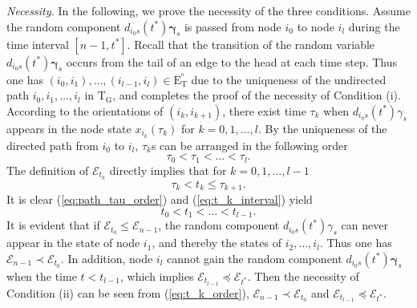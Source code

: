 \documentclass[a4paper, 11pt]{article}
\newcommand{\1}{\mathbf{1}}
\newcommand{\asf}{\mathcal{E}}
\newcommand{\mG}{\mathrm{G}}
\newcommand{\mE}{\mathrm{E}}
\newcommand{\mT}{\mathrm{T}}
\newcommand{\mET}{\mE_{\mT}^{^o}}
\newcommand{\gammab}{{\bm \gamma}}
\newcommand{\tbeg}{n-1 }
\newcommand{\tend}{t^\ast}
\begin{document}
\medskip
\emph{Necessity.}
In the following, we prove the necessity of the three conditions. Assume the random component $d_{i_0 s}(\tend)\gammab_{s}$ is passed from node $i_0$ to node $i_l$ during the time interval $[\tbeg,\tend]$. Recall that the transition of the random variable $d_{i_0 s}(\tend)\gammab_{s}$ occurs from the tail of an edge to the head at each time step. Thus one has $(i_0,i_1),\dots,(i_{l-1},i_l)\in\mET$ due to the uniqueness of the undirected path $i_0,i_1,\dots,i_l$ in $\mT_\mG$, and completes the proof of the necessity of Condition (i).\\
According to the orientations of $(i_k,i_{k+1})$, there exist time $\tau_k$ when $d_{i_0 s}(\tend)\gamma_{s}$ appears in the node state $x_{i_k}(\tau_k)$ for $k=0,1,\dots,l$. By the uniqueness of the directed path from $i_0$ to $i_l$, $\tau_k$s can be arranged in the following order
\begin{equation}\label{eq:path_tau_order}
\tau_0<\tau_1<\dots<\tau_l.
\end{equation}
The definition of $\asf_{t_k}$ directly implies that for $k=0,1,\dots,l-1$
\begin{equation}\label{eq:t_k_interval}
\tau_k<t_k\le\tau_{k+1}.
\end{equation}
It is clear (\ref{eq:path_tau_order}) and (\ref{eq:t_k_interval}) yield
\begin{equation}\label{eq:t_k_order}
t_0<t_1<\dots<t_{l-1}.
\end{equation}
It is evident that if $\asf_{t_0}\le\asf_{\tbeg}$, the random component $d_{i_0 s}(\tend)\gamma_{s}$ can never appear in the state of node $i_1$, and thereby the states of $i_2,\dots,i_l$. Thus one has $\asf_{\tbeg}\prec\asf_{t_0}$.
In addition, node $i_l$ cannot gain the random component $d_{i_0 s}(\tend)\gammab_{s}$ when the time $t<t_{l-1}$, which implies $\asf_{t_{l-1}}\preceq\asf_{\tend}$.
Then the necessity of Condition (ii) can be seen from (\ref{eq:t_k_order}), $\asf_{\tbeg}\prec\asf_{t_0}$ and $\asf_{t_{l-1}}\preceq\asf_{\tend}$.\\
\end{document}
